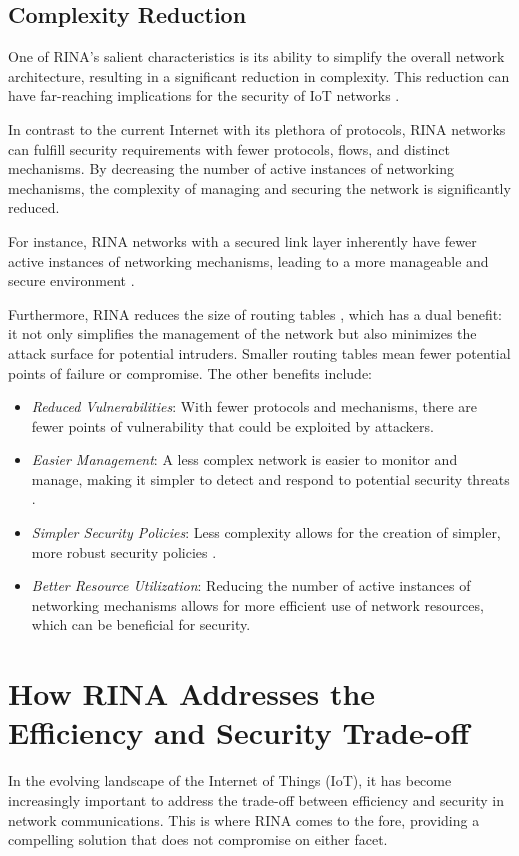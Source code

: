 \documentclass{ieeeaccess}
\begin{document}
\subsection{Complexity Reduction}

One of RINA's salient characteristics is its ability to simplify the overall network architecture, resulting in a significant reduction in complexity. This reduction can have far-reaching implications for the security of IoT networks \cite{small2012}.

In contrast to the current Internet with its plethora of protocols, RINA networks can fulfill security requirements with fewer protocols, flows, and distinct mechanisms. By decreasing the number of active instances of networking mechanisms, the complexity of managing and securing the network is significantly reduced.

For instance, RINA networks with a secured link layer inherently have fewer active instances of networking mechanisms, leading to a more manageable and secure environment \cite{small2012}.

Furthermore, RINA reduces the size of routing tables \cite{leon2016benefits, hrizi2017hierarchical, hrizi2015sfr}, which has a dual benefit: it not only simplifies the management of the network but also minimizes the attack surface for potential intruders. Smaller routing tables mean fewer potential points of failure or compromise. The other benefits include:

\begin{itemize}
	\item \textit{Reduced Vulnerabilities}: With fewer protocols and mechanisms, there are fewer points of vulnerability that could be exploited by attackers.
	\item \textit{Easier Management}: A less complex network is easier to monitor and manage, making it simpler to detect and respond to potential security threats \cite{en14102818}. 
	\item \textit{Simpler Security Policies}: Less complexity allows for the creation of simpler, more robust security policies \cite{s20051464}. 	
	\item \textit{Better Resource Utilization}: Reducing the number of active instances of networking mechanisms allows for more efficient use of network resources, which can be beneficial for security.
\end{itemize}

\section{How RINA Addresses the Efficiency and Security Trade-off} \label{sec:rina-tradeoff}
In the evolving landscape of the Internet of Things (IoT), it has become increasingly important to address the trade-off between efficiency and security in network communications. This is where RINA comes to the fore, providing a compelling solution that does not compromise on either facet.
\end{document}
